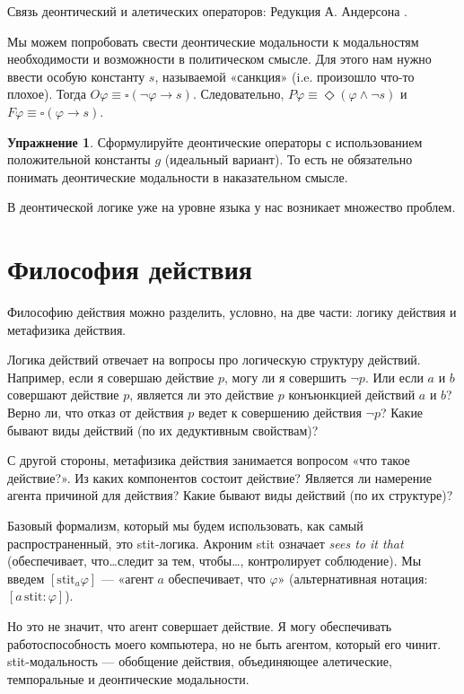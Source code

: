 \documentclass[openany]{book}
\theoremstyle{plain}
\theoremstyle{definition}
\newtheorem{xrc}{Упражнение}[]
\begin{document}
Связь деонтический и алетических операторов: Редукция А. Андерсона \cite{Anderson}. 

Мы можем попробовать свести деонтические модальности к модальностям необходимости и возможности в политическом смысле. Для этого нам нужно ввести особую константу \(s\), называемой «санкция» (i.e. произошло что-то плохое). Тогда \(O \varphi \equiv \square (\neg \varphi \to s)\). Следовательно, \(P \varphi \equiv \Diamond (\varphi \land \neg s)\) и \(F \varphi \equiv \square (\varphi \to s)\).

\begin{xrc}
    Сформулируйте деонтические операторы с использованием положительной константы \(g\) (идеальный вариант). То есть не обязательно понимать деонтические модальности в наказательном смысле.
\end{xrc}

В деонтической логике уже на уровне языка у нас возникает множество проблем.

\section{Философия действия}

Философию действия можно разделить, условно, на две части: логику действия и метафизика действия.

Логика действий отвечает на вопросы про логическую структуру действий. Например, если я совершаю действие \(p\), могу ли я совершить \(\neg p\). Или если \(a\) и \(b\) совершают действие \(p\), является ли это действие \(p\) конъюнкцией действий \(a\) и \(b\)? Верно ли, что отказ от действия \(p\) ведет к совершению действия \(\neg p\)? Какие бывают виды действий (по их дедуктивным свойствам)?

С другой стороны, метафизика действия занимается вопросом «что такое действие?». Из каких компонентов состоит действие? Является ли намерение агента причиной для действия? Какие бывают виды действий (по их структуре)?

Базовый формализм, который мы будем использовать, как самый распространенный, это stit-логика. Акроним stit означает \textit{sees to it that} (обеспечивает, что\dots следит за тем, чтобы\dots, контролирует соблюдение). Мы введем \([\mathrm{stit}_{a}\varphi]\) --- «агент \(a\) обеспечивает, что \(\varphi\)» (альтернативная нотация: \([a \,\mathrm{stit}: \varphi]\)).

Но это не значит, что агент совершает действие. Я могу обеспечивать работоспособность моего компьютера, но не быть агентом, который его чинит. stit-модальность --- обобщение действия, объединяющее алетические, темпоральные и деонтические модальности. 
\end{document}
